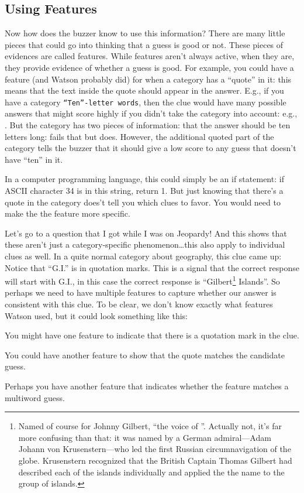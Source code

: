 \subsection{Using Features}
\label{sec:watson:features}

Now how does the buzzer know to use this information?
%
There are many little pieces that could go into thinking that a guess is good
or not.  These pieces of evidences are called features.
%
While features aren’t
always active, when they are, they provide evidence of whether a guess is
good.
%
For example, you could have a feature (and Watson probably did) for
when a category has a ``quote'' in it: this means that the text inside the
quote should appear in the answer.
%
E.g., if you have a category \texttt{``Ten''-letter words}, then the clue
would have many possible answers that might score highly if you didn't take
the category into account: e.g., .
%
But the category has two pieces of information: that the answer should be ten
letters long:  fails that but  does.
%
However, the additional quoted part of the category tells the buzzer that it
should give a low score to any guess that doesn't have ``ten'' in it.

In a computer programming language, this could simply be an if statement: if
ASCII character 34 is in this string, return 1.  But just knowing that there’s
a quote in the category does’t tell you which clues to favor.  You would need
to make the the feature more specific.

Let’s go to a question that I got while I was on Jeopardy!  And this shows
that these aren’t just a category-specific phenomenon\dots this
also apply to individual clues as well.  In a quite normal category about
geography, this clue came up:
Notice that ``G.I.'' is in quotation marks.  This is a signal that the correct response will start with G.I., in this case the correct response is ``Gilbert\footnote{Named of course for Johnny Gilbert, ``the voice of \jeopardy{}''.  Actually not, it’s far more confusing than that: it was named by a German admiral---Adam Johann von Krusenstern---who led the first Russian circumnavigation of the globe.  Krusenstern recognized that the British Captain Thomas Gilbert had described each of the islands individually and applied the the name to the group of islands.}
Islands''.
%
So perhaps we need to have multiple features to capture whether our answer is
consistent with this clue.
%
To be clear, we don’t know exactly what features Watson used, but it could
look something like this:
\begin{itemize*}
  \item You might have one feature to indicate that there is a quotation mark
    in the clue.
    \item You could have another feature to show that the quote matches the
      candidate guess.
      \item Perhaps you have another feature that indicates whether the
        feature matches a multiword guess.
\end{itemize*}

